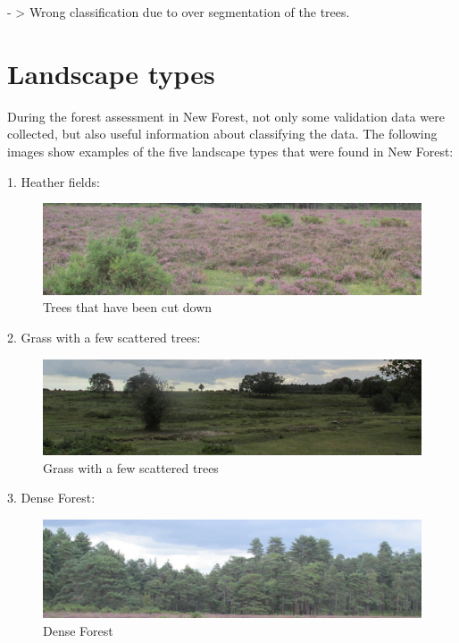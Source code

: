 \documentclass{subfiles}
\begin{document}
	   - > Wrong classification due to over segmentation of the trees. 
   \newpage
\section{	Landscape types}
	During the forest assessment in New Forest, not only some validation data were collected, but also useful information about classifying the data. The following images show examples of the five landscape types that were found in New Forest:
	
	1.	Heather fields:
    
      \begin{figure} [!h]
      	\centering
      	\includegraphics[width=\textwidth]{img/NewForest/LT_HeatherFields}
      	\caption{Trees that have been cut down}
      	\label{fig:LT_HeatherFields}
      \end{figure}

    
    2.	Grass with a few scattered trees:
          \begin{figure} [!h]
          	\centering
          	\includegraphics[width=\textwidth]{img/NewForest/LT_GrassWithFewTrees}
          	\caption{Grass with a few scattered trees}
          	\label{fig:LT_GrassWithFewTrees}
          \end{figure}

    3.	Dense Forest:
          \begin{figure} [!h]
          	\centering
          	\includegraphics[width=\textwidth]{img/NewForest/LT_DenseForest}
          	\caption{Dense Forest}
          	\label{fig:LT_DenseForest}
          \end{figure}
          
\end{document}
